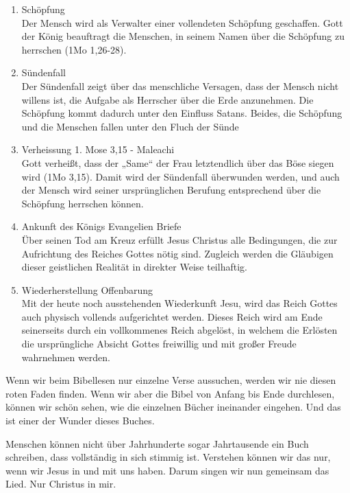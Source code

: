    \begin{enumerate}
    \item Schöpfung \\
     Der Mensch wird als Verwalter einer vollendeten Schöpfung geschaffen. Gott der König 
beauftragt die Menschen, in seinem Namen über die Schöpfung zu herrschen (1Mo 
1,26-28). 
    \item Sündenfall \\
    Der Sündenfall zeigt über das menschliche Versagen, dass der Mensch nicht willens ist, 
die Aufgabe als Herrscher über die Erde anzunehmen. Die Schöpfung kommt dadurch 
unter den Einfluss Satans. Beides, die Schöpfung und die Menschen fallen unter den 
Fluch der Sünde
    \item Verheissung 1. Mose 3,15 - Maleachi\\
    Gott verheißt, dass der „Same“ der Frau letztendlich über das Böse siegen wird (1Mo 
3,15). Damit wird der Sündenfall überwunden werden, und auch der Mensch wird 
seiner ursprünglichen Berufung entsprechend über die Schöpfung herrschen können.
    \item Ankunft des Königs Evangelien Briefe\\
     Über seinen Tod am Kreuz erfüllt Jesus Christus alle Bedingungen, die zur Aufrichtung 
des Reiches Gottes nötig sind. Zugleich werden die Gläubigen dieser geistlichen 
Realität in direkter Weise teilhaftig. 
    \item Wiederherstellung Offenbarung\\
     Mit der heute noch ausstehenden Wiederkunft Jesu, wird das Reich Gottes auch 
physisch vollends aufgerichtet werden. Dieses Reich wird am Ende seinerseits durch ein 
 vollkommenes Reich abgelöst, in welchem die Erlösten die ursprüngliche Absicht 
Gottes freiwillig und mit großer Freude wahrnehmen werden.
   \end{enumerate}

Wenn wir beim Bibellesen nur einzelne Verse aussuchen, werden wir nie diesen roten Faden finden. Wenn wir aber die Bibel von Anfang bis Ende durchlesen, können wir schön sehen, wie die einzelnen Bücher ineinander eingehen. Und das ist einer der Wunder dieses Buches.

Menschen können nicht über Jahrhunderte sogar Jahrtausende ein Buch schreiben, dass vollständig in sich stimmig ist. Verstehen können wir das nur, wenn wir Jesus in und mit uns haben. Darum singen wir nun gemeinsam das Lied. Nur Christus in mir.
